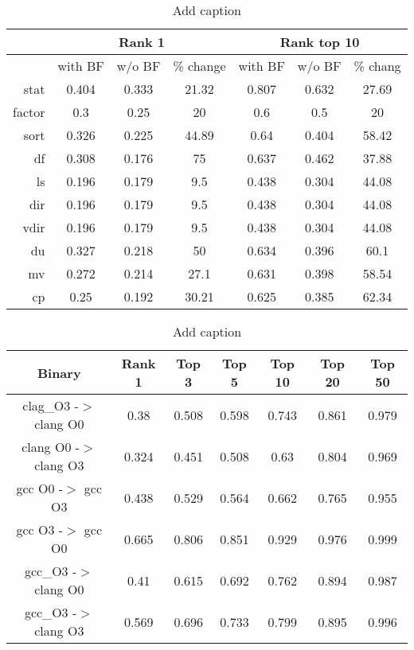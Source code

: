 \documentclass{article}
\begin{document}
\begin{table}[t]
  \centering
  \label{tab:table1}%
  \caption{Add caption}
    \begin{tabular}{|r|ccc|ccc|} \hline
          & \multicolumn{3}{|c|}{Rank 1} & \multicolumn{3}{|c|}{Rank top 10} \\ \hline
          & with BF & w/o BF & \% change & with BF & w/o BF & \% chang \\ \hline
    stat  & 0.404 & 0.333 & 21.32 & 0.807 & 0.632 & 27.69 \\
    factor & 0.3   & 0.25  & 20    & 0.6   & 0.5   & 20 \\
    sort  & 0.326 & 0.225 & 44.89 & 0.64  & 0.404 & 58.42 \\
    df    & 0.308 & 0.176 & 75    & 0.637 & 0.462 & 37.88 \\
    ls    & 0.196 & 0.179 & 9.5   & 0.438 & 0.304 & 44.08 \\
    dir   & 0.196 & 0.179 & 9.5   & 0.438 & 0.304 & 44.08 \\
    vdir  & 0.196 & 0.179 & 9.5   & 0.438 & 0.304 & 44.08 \\
    du    & 0.327 & 0.218 & 50    & 0.634 & 0.396 & 60.1 \\
    mv    & 0.272 & 0.214 & 27.1  & 0.631 & 0.398 & 58.54 \\
    cp    & 0.25  & 0.192 & 30.21 & 0.625 & 0.385 & 62.34 \\ \hline
    \end{tabular}%
\end{table}%

\begin{table}[htbp]
	\centering
	\label{tab:table2}%
	\caption{Add caption}
	\begin{tabular}{|c|cccccc|} \hline
		Binary & Rank 1 & Top 3 & Top 5 & Top 10 & Top 20 & Top 50 \\ \hline
		clag\_O3 -$>$ clang O0 & 0.38  & 0.508 & 0.598 & 0.743 & 0.861 & 0.979 \\
		clang O0 -$>$ clang O3 & 0.324 & 0.451 & 0.508 & 0.63  & 0.804 & 0.969 \\
		gcc O0 -$>$ gcc O3 & 0.438 & 0.529 & 0.564 & 0.662 & 0.765 & 0.955 \\
		gcc O3 -$>$ gcc O0 & 0.665 & 0.806 & 0.851 & 0.929 & 0.976 & 0.999 \\
		gcc\_O3 -$>$ clang O0 & 0.41  & 0.615 & 0.692 & 0.762 & 0.894 & 0.987 \\
		gcc\_O3 -$>$ clang O3 & 0.569 & 0.696 & 0.733 & 0.799 & 0.895 & 0.996 \\
		\hline
	\end{tabular}%
\end{table}%
\end{document}
